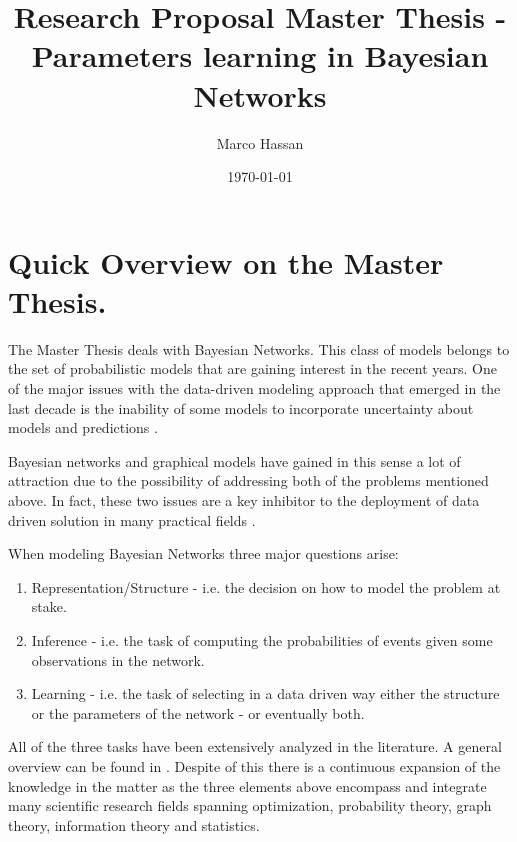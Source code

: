 \documentclass[a4paper]{article}
\author{Marco Hassan}
\date{\today}
\title{Research Proposal Master Thesis - Parameters learning in Bayesian Networks}
\begin{document}
\maketitle
\tableofcontents

\setlength\parindent{0pt}
\newpage

\section{Quick Overview on the Master Thesis.}
\label{sec:org6da4c6d}


The Master Thesis deals with Bayesian Networks. This class of models
belongs to the set of probabilistic models that are gaining interest
in the recent years.  One of the major issues with the data-driven
modeling approach that emerged in the last decade is the inability
of some models to incorporate uncertainty about models and
predictions \cite{ghahramani15_probab_machin_learn_artif_intel}.

Bayesian networks and graphical models
\cite{ben-gal08_bayes_networ,koller2009probabilistic,Larra_aga_2011}
have gained in this sense a lot of attraction due to the possibility
of addressing both of the problems mentioned above. In fact, these
two issues are a key inhibitor to the deployment of data driven solution
in many practical fields \cite{Kl_s_2018}.

When modeling Bayesian Networks three major questions arise:

\begin{enumerate}
\item Representation/Structure - i.e. the decision on how to model the
problem at stake.

\item Inference - i.e. the task of computing the
probabilities of events given some observations in the network.

\item Learning - i.e. the task of selecting in a data driven way either
the structure or the parameters of the network - or eventually
both.
\end{enumerate}

All of the three tasks have been extensively analyzed in the
literature. A general overview can be found in
\cite{koller2009probabilistic}. Despite of this there is a continuous
expansion of the knowledge in the matter as the three elements above
encompass and integrate many scientific research fields spanning
optimization, probability theory, graph theory, information theory
and statistics.
\end{document}
